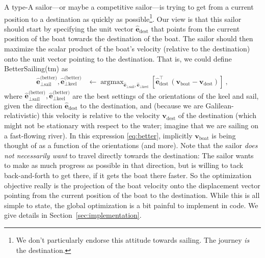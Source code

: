 \documentclass[letterpaper]{article}
\DeclareMathOperator*{\argmax}{argmax}
\renewcommand{\vec}[1]{\boldsymbol{#1}}
\newcommand{\uvec}{\vec{\hat{e}}}
\newcommand{\boat}{\text{boat}}
\newcommand{\destination}{\text{dest}}
\newcommand{\better}{\text{(better)}}
\newcommand{\sail}{\text{sail}}
\newcommand{\keel}{\text{keel}}
\newcommand{\vboat}{\vec{v}_\boat}
\newcommand{\vdest}{\vec{v}_\destination}
\newcommand{\secref}[1]{Section~\ref{#1}}
\begin{document}
A type-A sailor---or maybe a competitive sailor---is trying to get from a current position to a destination as quickly as possible\footnote{%
We don't particularly endorse this attitude towards sailing. The journey \emph{is} the destination.}.
Our view is that this sailor should start by specifying the unit vector $\uvec_\destination$ that points from the current position of the boat towards the destination of the boat.
The sailor should then maximize the scalar product of the boat's velocity (relative to the destination) onto the unit vector pointing to the destination.
That is, we could define BetterSailing(tm) as
\begin{align}\label{eq:better}
    \uvec_{\perp\sail}^\better,\uvec_{\perp\keel}^\better &\leftarrow \argmax_{\uvec_{\perp\sail},\uvec_{\perp\keel}} \left[\uvec_\destination^\top\,(\vboat-\vdest)\right] ~,
\end{align}
where $\uvec_{\perp\sail}^\better,\uvec_{\perp\keel}^\better$ are the best settings of the orientations of the keel and sail, given the direction $\uvec_\destination$ to the destination, and (because we are Galilean-relativistic) this velocity is relative to the velocity $\vdest$ of the destination (which might not be stationary with respect to the water; imagine that we are sailing on a fast-flowing river).
In this expression \eqref{eq:better}, implicitly $\vboat$ is being thought of as a function of the orientations (and more).
Note that the sailor \emph{does not necessarily want} to travel directly towards the destination:
The sailor wants to make as much progress as possible in that direction, but is willing to tack back-and-forth to get there, if it gets the boat there faster.
So the optimization objective really is the projection of the boat velocity onto the displacement vector pointing from the current position of the boat to the destination.
While this is all simple to state, the global optimization is a bit painful to implement in code.
We give details in \secref{sec:implementation}.
\end{document}

